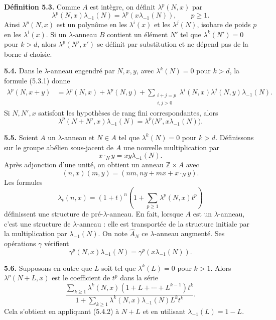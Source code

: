 \documentclass[11pt]{article}
\begin{document}
\textbf{Définition 5.3.} Comme \(A\) est intègre, on définit \(\lambda^p(N,x)\) par
\begin{equation}\tag{5.3.1}
  \lambda^p(N,x)\lambda_{-1}(N)=\lambda^p(x\lambda_{-1}(N)),
  \qquad p\ge1.
\end{equation}
Ainsi \(\lambda^p(N,x)\) est un polynôme en les \(\lambda^i(x)\) et les \(\lambda^j(N)\), isobare de poids \(p\) en les \(\lambda^i(x)\). Si un \(\lambda\)-anneau \(B\) contient un élément \(N'\) tel que \(\lambda^k(N')=0\) pour \(k>d\), alors \(\lambda^p(N',x')\) se définit par substitution et ne dépend pas de la borne \(d\) choisie.

\textbf{5.4.} Dans le \(\lambda\)-anneau engendré par \(N,x,y\), avec \(\lambda^k(N)=0\) pour \(k>d\), la formule (5.3.1) donne
\begin{align}
 \lambda^p(N,x+y)
 &=\lambda^p(N,x)+\lambda^p(N,y)
   +\sum_{\substack{i+j=p\\ i,j>0}}
     \lambda^i(N,x)\lambda^j(N,y)\lambda_{-1}(N).
 \tag{5.4.1}
\end{align}
Si \(N,N',x\) satisfont les hypothèses de rang fini correspondantes, alors
\begin{equation}\tag{5.4.2}
  \lambda^p(N+N',x)\lambda_{-1}(N)
  =\lambda^p\bigl(N',x\lambda_{-1}(N)\bigr).
\end{equation}

\textbf{5.5.} Soient \(A\) un \(\lambda\)-anneau et \(N\in A\) tel que \(\lambda^k(N)=0\) pour \(k>d\). Définissons sur le groupe abélien sous-jacent de \(A\) une nouvelle multiplication par
\[
  x\cdot_N y=xy\lambda_{-1}(N).
\]
Après adjonction d'une unité, on obtient un anneau \(\mathbb Z\times A\) avec
\[
  (n,x)(m,y)=(nm,ny+mx+x\cdot_N y).
\]
Les formules
\begin{equation}\tag{5.5.1}
  \lambda_t(n,x)=(1+t)^n\left(1+
  \sum_{p\ge1}\lambda^p(N,x)t^p\right)
\end{equation}
définissent une structure de pré-\(\lambda\)-anneau. En fait, lorsque \(A\) est un \(\lambda\)-anneau, c'est une structure de \(\lambda\)-anneau : elle est transportée de la structure initiale par la multiplication par \(\lambda_{-1}(N)\). On note \(\widehat A_N\) ce \(\lambda\)-anneau augmenté. Ses opérations \(\gamma\) vérifient
\begin{equation}\tag{5.5.2}
  \gamma^p(N,x)\lambda_{-1}(N)=\gamma^p(x\lambda_{-1}(N)).
\end{equation}

\textbf{5.6.} Supposons en outre que \(L\) soit tel que \(\lambda^k(L)=0\) pour \(k>1\). Alors \(\lambda^p(N+L,x)\) est le coefficient de \(t^p\) dans la série
\begin{equation}\tag{5.6.1}
  \frac{\displaystyle\sum_{k\ge1}\lambda^k(N,x)
        (1+L+\cdots+L^{k-1})t^k}
       {\displaystyle 1+\sum_{k\ge1}\lambda^k(N,x)
        \lambda_{-1}(N)L^k t^k}.
\end{equation}
Cela s'obtient en appliquant (5.4.2) à \(N+L\) et en utilisant \(\lambda_{-1}(L)=1-L\).
\end{document}
